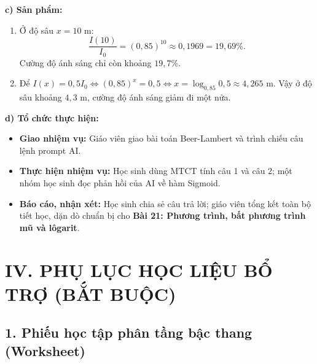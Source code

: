 \documentclass[12pt, a4paper]{article}
\begin{document}
\noindent \textbf{c) Sản phẩm:}
\begin{enumerate}[leftmargin=0.6cm]
    \item Ở độ sâu $x = 10\text{ m}$:
    $$\dfrac{I(10)}{I_0} = (0{,}85)^{10} \approx 0{,}1969 = 19{,}69\%.$$
    Cường độ ánh sáng chỉ còn khoảng $19{,}7\%$.
    \item Để $I(x) = 0{,}5 I_0 \iff (0{,}85)^x = 0{,}5 \iff x = \log_{0{,}85} 0{,}5 \approx 4{,}265\text{ m}$.
    Vậy ở độ sâu khoảng $4{,}3\text{ m}$, cường độ ánh sáng giảm đi một nửa.
\end{enumerate}

\noindent \textbf{d) Tổ chức thực hiện:}
\begin{itemize}[leftmargin=0.6cm]
    \item \textbf{Giao nhiệm vụ:} Giáo viên giao bài toán Beer-Lambert và trình chiếu câu lệnh prompt AI.
    \item \textbf{Thực hiện nhiệm vụ:} Học sinh dùng MTCT tính câu 1 và câu 2; một nhóm học sinh đọc phản hồi của AI về hàm Sigmoid.
    \item \textbf{Báo cáo, nhận xét:} Học sinh chia sẻ câu trả lời; giáo viên tổng kết toàn bộ tiết học, dặn dò chuẩn bị cho \textbf{Bài 21: Phương trình, bất phương trình mũ và lôgarit}.
\end{itemize}

\vspace{10pt}

\section*{IV. PHỤ LỤC HỌC LIỆU BỔ TRỢ (BẮT BUỘC)}

\subsection*{1. Phiếu học tập phân tầng bậc thang (Worksheet)}
\end{document}
